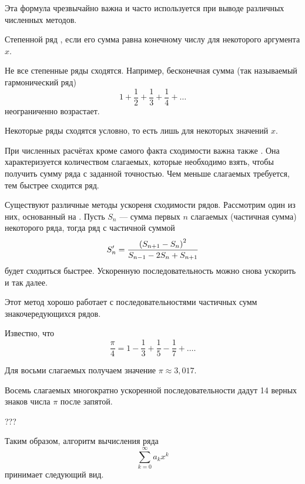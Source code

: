 Эта формула чрезвычайно важна и часто используется при выводе
различных численных методов.


\begin{defn}
Степенной ряд , если его
сумма равна конечному числу для некоторого аргумента $x$.
\end{defn}

Не все степенные ряды сходятся. Например, бесконечная сумма (так
называемый гармонический ряд)
\[
1+\frac{1}{2}+\frac{1}{3}+\frac{1}{4}+\ldots
\]
неограниченно возрастает.

Некоторые ряды сходятся условно, то есть лишь для некоторых значений
$x$.


При численных расчётах кроме самого факта сходимости важна также
. Она характеризуется
количеством слагаемых, которые необходимо взять, чтобы получить сумму
ряда с заданной точностью. Чем меньше слагаемых требуется, тем быстрее
сходится ряд.

Существуют различные методы ускореня сходимости рядов. Рассмотрим один из них,
основанный на . Пусть $S_n$ —
сумма первых $n$ слагаемых (частичная сумма) некоторого ряда, тогда
ряд с частичной суммой
\[
S'_n = {\left(S_{n+1} - S_n\right)^2 \over S_{n-1} - 2 S_n + S_{n+1}}
\]
будет сходиться быстрее. Ускоренную последовательность можно снова
ускорить и так далее.

Этот метод хорошо работает с последовательностями частичных сумм
знакочередующихся рядов.

\begin{example}
Известно, что
\[
\frac{\pi}4 = 1 - \frac13 + \frac15 - \frac17 + \ldots.
\]

Для восьми слагаемых получаем значение $\pi \approx 3{,}017$.

Восемь слагаемых многократно ускоренной последовательности дадут 14
верных знаков числа $\pi$ после запятой.
\end{example}

\Practice


???

Таким образом, алгоритм вычисления ряда
\[
\sum_{k=0}^{\infty}a_{k}x^{k}
\]
принимает следующий вид.


%
%

